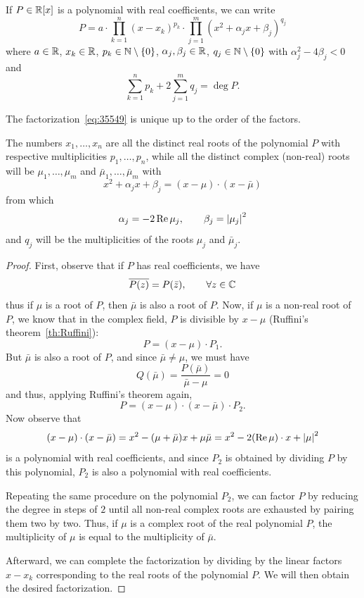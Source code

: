 \begin{theorem}
  \label{th:fattorizzazione_polinomio_reale}%
If $P\in {\mathbb R}[x]$ is a polynomial with real coefficients, we can write
\begin{equation}\label{eq:35549}
    P = a \cdot \prod_{k=1}^n (x-x_k)^{p_k} \cdot \prod_{j=1}^m (x^2 + \alpha_j
  x + \beta_j)^{q_j}
\end{equation}
where $a\in {\mathbb R}$, $x_k\in {\mathbb R}$, $p_k\in {\mathbb N}\setminus{\left\{ 0 \right\}}$,
$\alpha_j,\beta_j\in {\mathbb R}$, $q_j\in {\mathbb N}\setminus{\left\{ 0 \right\}}$
with $\alpha_j^2 - 4 \beta_j < 0$
and
\[
  \sum_{k=1}^n p_k + 2 \sum_{j=1}^m q_j = \deg P.
\]

The factorization~\eqref{eq:35549} is unique up to the order of the factors.

The numbers $x_1,\dots,x_n$ are all the distinct real roots of the polynomial
$P$ with respective multiplicities $p_1,\dots,p_n$, while all the distinct
complex (non-real) roots will be $\mu_1,\dots, \mu_m$ and $\bar \mu_1, \dots,
\bar \mu_m$ with
\[
  x^2 + \alpha_j x + \beta_j = (x-\mu)\cdot(x-\bar \mu)
\]
from which
\[
  \alpha_j = -2\operatorname{Re} \mu_j, \qquad \beta_j={\left|\mu_j\right|}^2
\]
and $q_j$ will be the multiplicities of the roots $\mu_j$ and $\bar \mu_j$.
\end{theorem}
%
\begin{proof}
First, observe that if $P$ has real coefficients, we have
\[
  \overline{P(z)} = P(\bar z), \qquad \forall z\in {\mathbb C}
\]
thus if $\mu$ is a root of $P$, then $\bar \mu$ is also a root of $P$.
Now, if $\mu$ is a non-real root of $P$, we know that in the complex field, $P$
is divisible by $x-\mu$ (Ruffini's theorem~\ref{th:Ruffini}):
\[
  P = (x-\mu) \cdot P_1.
\]
But $\bar \mu$ is also a root of $P$, and since $\bar \mu \neq \mu$, we must
have
\[
Q(\bar \mu) = \frac{P(\bar \mu)}{\bar \mu - \mu} = 0
\]
and thus, applying Ruffini's theorem again,
\[
 P = (x-\mu)\cdot (x-\bar \mu)\cdot P_2.
\]
Now observe that
\[
(x-\mu)\cdot(x-\bar \mu) = x^2 - (\mu + \bar \mu) x + \mu \bar \mu
 = x^2 - 2 (\operatorname{Re} \mu)\cdot x + {\left|\mu\right|}^2
\]
is a polynomial with real coefficients, and since $P_2$ is obtained by dividing
$P$ by this polynomial, $P_2$ is also a polynomial with real coefficients.

Repeating the same procedure on the polynomial $P_2$, we can factor $P$ by
reducing the degree in steps of $2$ until all non-real complex roots are
exhausted by pairing them two by two.
Thus, if $\mu$ is a complex root of the real polynomial $P$, the multiplicity of
$\mu$ is equal to the multiplicity of $\bar \mu$.

Afterward, we can complete the factorization by dividing by the linear factors
$x-x_k$ corresponding to the real roots of the polynomial $P$.
We will then obtain the desired factorization.
\end{proof}